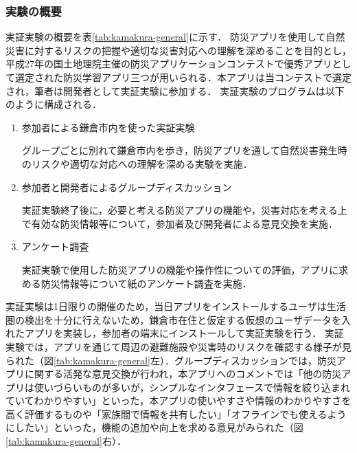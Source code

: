 \documentclass[a4paper]{jsarticle}
\begin{document}
\subsubsection{実験の概要}
実証実験の概要を表\ref{tab:kamakura-general}に示す．
防災アプリを使用して自然災害に対するリスクの把握や適切な災害対応への理解を深めることを目的とし，平成27年の国土地理院主催の防災アプリケーションコンテストで優秀アプリとして選定された防災学習アプリ三つが用いられる．本アプリは当コンテストで選定され，筆者は開発者として実証実験に参加する．
実証実験のプログラムは以下のように構成される．

\begin{enumerate}
  \item 参加者による鎌倉市内を使った実証実験

  グループごとに別れて鎌倉市内を歩き，防災アプリを通して自然災害発生時のリスクや適切な対応への理解を深める実験を実施．

  \item 参加者と開発者によるグループディスカッション

  実証実験終了後に，必要と考える防災アプリの機能や，災害対応を考える上で有効な防災情報等について，参加者及び開発者による意見交換を実施．

  \item アンケート調査

  実証実験で使用した防災アプリの機能や操作性についての評価，アプリに求める防災情報等について紙のアンケート調査を実施．

\end{enumerate}

実証実験は1日限りの開催のため，当日アプリをインストールするユーザは生活圏の検出を十分に行えないため，鎌倉市在住と仮定する仮想のユーザデータを入れたアプリを実装し，参加者の端末にインストールして実証実験を行う．
実証実験では，アプリを通じて周辺の避難施設や災害時のリスクを確認する様子が見られた（図\ref{tab:kamakura-general}左）．グループディスカッションでは，防災アプリに関する活発な意見交換が行われ，本アプリへのコメントでは「他の防災アプリは使いづらいものが多いが，シンプルなインタフェースで情報を絞り込まれていてわかりやすい」といった，本アプリの使いやすさや情報のわかりやすさを高く評価するものや「家族間で情報を共有したい」「オフラインでも使えるようにしたい」といった，機能の追加や向上を求める意見がみられた（図\ref{tab:kamakura-general}右）．
\end{document}

